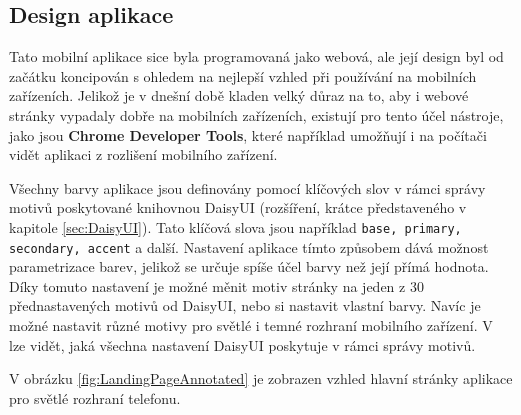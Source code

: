 \subsection{Design aplikace}\label{sec:DesignAplikace}

Tato mobilní aplikace sice byla programovaná jako webová, ale její design byl od začátku koncipován s ohledem na nejlepší vzhled při používání na mobilních zařízeních. Jelikož je v dnešní době kladen velký důraz na to, aby i webové stránky vypadaly dobře na mobilních zařízeních, existují pro tento účel nástroje, jako jsou \textbf{Chrome Developer Tools}, které například umožňují i na počítači vidět aplikaci z rozlišení mobilního zařízení.


Všechny barvy aplikace jsou definovány pomocí klíčových slov v rámci správy motivů poskytované knihovnou DaisyUI (rozšíření, krátce představeného v kapitole \ref{sec:DaisyUI}). Tato klíčová slova jsou například \texttt{base, primary, secondary, accent} a další. Nastavení aplikace tímto způsobem dává možnost parametrizace barev, jelikož se určuje spíše účel barvy než její přímá hodnota. Díky tomuto nastavení je možné měnit motiv stránky na jeden z 30 přednastavených motivů od DaisyUI, nebo si nastavit vlastní barvy. Navíc je možné nastavit různé motivy pro světlé i temné rozhraní mobilního zařízení. V \cite{DaisyUIthemeGenerator} lze vidět, jaká všechna nastavení DaisyUI poskytuje v rámci správy motivů.

V obrázku \ref{fig:LandingPageAnnotated} je zobrazen vzhled hlavní stránky aplikace pro světlé rozhraní telefonu.

